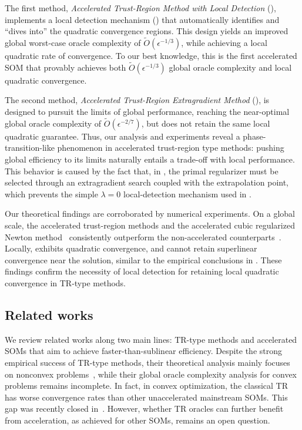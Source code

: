 \documentclass{article}
\begin{document}
The first method, \emph{Accelerated Trust-Region Method with Local Detection} (), implements a local detection mechanism () that automatically identifies and ``dives into'' the quadratic convergence regions. This design yields an improved global worst-case oracle complexity of $\tilde{O}(\epsilon^{-1/3})$, while achieving a local quadratic rate of convergence. To our best knowledge, this is the first accelerated SOM that provably achieves both $\tilde{O}(\epsilon^{-1/3})$ global oracle complexity and local quadratic convergence.

The second method, \emph{Accelerated Trust-Region Extragradient Method} (), is designed to pursuit the limits of global performance, reaching the near-optimal global oracle complexity of $\tilde{O}(\epsilon^{-2/7})$, but does not retain the same local quadratic guarantee. Thus, our analysis and experiments reveal a phase-transition-like phenomenon in accelerated trust-region type methods: pushing global efficiency to its limits naturally entails a trade-off with local performance.
This behavior is caused by the fact that, in , the primal regularizer must be selected through an extragradient search coupled with the extrapolation point, which prevents the simple $\lambda=0$ local-detection mechanism used in .

Our theoretical findings are corroborated by numerical experiments. On a global scale, the accelerated trust-region methods and the accelerated cubic regularized Newton method~\cite{nesterov2008accelerating} consistently outperform the non-accelerated counterparts~\cite{jiang2026beyond,nesterov2006cubic}. Locally,  exhibits quadratic convergence, and \atrms{} cannot retain superlinear convergence near the solution, similar to the empirical conclusions in \cite{carmon2022optimal,jiang2024accelerated,huang2024inexact}. These findings confirm the necessity of local detection for retaining local quadratic convergence in TR-type methods.

\subsection{Related works}
We review related works along two main lines: TR-type methods and accelerated SOMs that aim to achieve faster-than-sublinear efficiency. Despite the strong empirical success of TR-type methods, their theoretical analysis mainly focuses on nonconvex problems~\cite{ye2005second,curtis2017trust,curtis2021trust,zhang2025homogeneous,hamad2022consistently,grapiglia2015on,hamad2024simple,curtis2023worst_i,ouyang2025trust}, while their global oracle complexity analysis for convex problems remains incomplete.
In fact, in convex optimization, the classical TR has worse convergence rates than other unaccelerated mainstream SOMs. This gap was recently closed in~\cite{jiang2026beyond}. However, whether TR oracles can further benefit from acceleration, as achieved for other SOMs, remains an open question.
\end{document}
